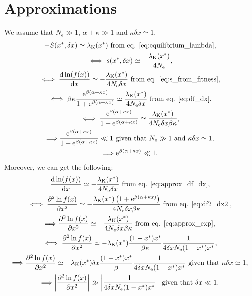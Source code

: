 \documentclass{article}
\newcommand{\der}{\mathrm{d}}
\newcommand{\e}{\mathrm{e}}
\newcommand{\Ne}{N_{\mathrm{e}}}
\newcommand{\Nstate}{\text{K}}
\newcommand{\x}{x}
\newcommand{\eq}{^{*}}
\newcommand{\dx}{\delta \x}
\begin{document}
\section*{Approximations}
We assume that $\Ne \gg 1$, $\alpha + \kappa \gg 1$ and $\kappa \dx \simeq 1$.
\begin{gather}
-S(\x\eq, \dx) \simeq \lambda_{\Nstate}(\x\eq)\text{ from eq. \ref{eq:equilibrium_lambda}}, \\
\iff s(\x\eq, \dx) \simeq -\frac{\lambda_{\Nstate}(\x\eq)}{4 \Ne}, \\
\iff \frac{\der \ln (f(\x))}{\der \x} \simeq - \frac{\lambda_{\Nstate}(\x\eq)}{4 \Ne \dx}\text{ from eq. \ref{eq:s_from_fitness}}, \label{eq:approx_df_dx}\\
\iff \beta \kappa \frac{\e^{\beta(\alpha + \kappa \x)}}{1 + \e^{\beta(\alpha + \kappa \x)} } \simeq \frac{\lambda_{\Nstate}(\x\eq)}{4 \Ne \dx}\text{ from eq. \ref{eq:df_dx}}, \\
\iff \frac{\e^{\beta(\alpha + \kappa \x)}}{1 + \e^{\beta(\alpha + \kappa \x)}} \simeq \frac{\lambda_{\Nstate}(\x\eq)}{4 \Ne \dx \beta \kappa}, \\
\Longrightarrow \frac{\e^{\beta(\alpha + \kappa \x)}}{1 + \e^{\beta(\alpha + \kappa \x)}} \ll 1\text{ given that $\Ne \gg 1$ and $\kappa \dx \simeq 1$}, \\
\Longrightarrow \e^{\beta(\alpha + \kappa \x)} \ll 1. \label{eq:approx_exp}
\end{gather}
Moreover, we can get the following:
\begin{gather}
\frac{\der \ln (f(\x))}{\der \x} \simeq - \frac{\lambda_{\Nstate}(\x\eq)}{4 \Ne \dx}\text{ from eq. \ref{eq:approx_df_dx}}, \\
\iff \frac{ \partial^2 \ln f(\x) }{\partial {\x}^2} \simeq - \frac{\lambda_{\Nstate}(\x\eq)\left( 1 + \e^{\beta(\alpha + \kappa \x)} \right)}{4 \Ne \dx \beta \kappa }\text{ from eq. \ref{eq:df2_dx2}}, \\
\Longrightarrow \frac{ \partial^2 \ln f(\x) }{\partial {\x}^2} \simeq - \frac{\lambda_{\Nstate}(\x\eq)}{4 \Ne \dx \beta \kappa }\text{ from eq. \ref{eq:approx_exp}}, \\
\iff \frac{ \partial^2 \ln f(\x) }{\partial {\x}^2} \simeq - \lambda_{\Nstate}(\x\eq) \frac{(1 - \x\eq)\x\eq }{\beta \kappa} \frac{1}{4 \dx \Ne  (1 - \x\eq) \x\eq}, \\
\Longrightarrow \frac{ \partial^2 \ln f(\x) }{\partial {\x}^2} \simeq - \lambda_{\Nstate}(\x\eq) \dx \frac{(1 - \x\eq)\x\eq }{\beta } \frac{1}{4 \dx \Ne  (1 - \x\eq) \x\eq}\text{ given that $\kappa \dx \simeq 1$}, \\
\Longrightarrow \left| \frac{ \partial^2 \ln f(\x) }{\partial {\x}^2} \right| \gg \left| \frac{1}{4 \dx \Ne  (1 - \x\eq) \x\eq} \right|\text{ given that $\dx \ll 1$}. \label{eq:approx_df2_df} \\
\end{gather}
\end{document}
